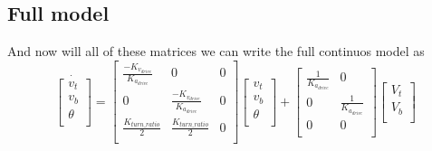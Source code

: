 \documentclass{scrartcl}
\begin{document}
\subsection{Full model}
And now will all of these matrices we can write the full continuos model as
\begin{equation}
    \dot{\begin{bmatrix}
            v_t    \\
            v_b    \\
            \theta \\
        \end{bmatrix}} =
    \begin{bmatrix}
        \frac{-K_{v_\mathit{drive}}}{K_{a_\mathit{drive}}} & 0                                                  & 0 \\
        0                                                  & \frac{-K_{v_\mathit{drive}}}{K_{a_\mathit{drive}}} & 0 \\
        \frac{K_\mathit{turn\_ratio}}{2}                   & \frac{K_\mathit{turn\_ratio}}{2}                   & 0 \\
    \end{bmatrix}\begin{bmatrix}
        v_t    \\
        v_b    \\
        \theta \\
    \end{bmatrix} + \begin{bmatrix}
        \frac{1}{K_{a_\mathit{drive}}} & 0                              \\
        0                              & \frac{1}{K_{a_\mathit{drive}}} \\
        0                              & 0                              \\
    \end{bmatrix}\begin{bmatrix}
        V_t \\
        V_b \\
    \end{bmatrix}
\end{equation}
\end{document}
